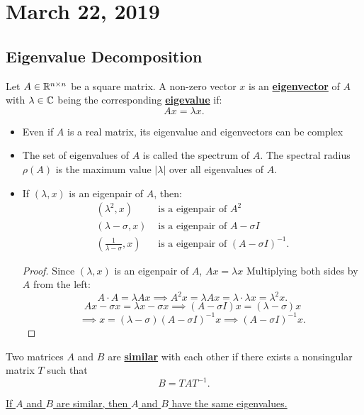 \documentclass[../main/main.tex]{subfiles}
\begin{document}
\section{March 22, 2019}
\subsection{Eigenvalue Decomposition}

		Let $A \in \mathbb{R}^{n\times n}$ be a square matrix. A non-zero vector $x$ is an \underline{\textbf{eigenvector}} of $A$ with  $\lambda\in \mathbb{C}$ being the corresponding \underline{\textbf{eigevalue}} if: \[
		Ax=\lambda x		.\]  	

\begin{itemize}
		\itemsep0.3cm
				\item Even if $A$ is a real matrix, its eigenvalue and eigenvectors can be complex
				\item The set of eigenvalues of $A$ is called the spectrum of $A$. The spectral radius $\rho\left( A \right) $ is the maximum value $\left| \lambda \right| $ over all eigenvalues of $A$.
				\item If $\left(\lambda,x \right) $ is an eigenpair of $A$, then:
						\begin{align*}
								\left( \lambda^2,x \right) &\textrm{ is a eigenpair of }A^2\\
								\left( \lambda-\sigma,x \right) &\textrm{ is a eigenpair of }A-\sigma I\\
								\left( \frac{1}{\lambda-\sigma},x \right) &\textrm{ is a eigenpair of }\left( A-\sigma I \right) ^{-1}
						.\end{align*}
\begin{proof}
							Since $\left( \lambda,x \right) $ is an eigenpair of $A$, $Ax=\lambda x$ Multiplying both sides by $A$ from the left:\[
				A\cdot A=\lambda A x \implies A^2x=\lambda Ax=\lambda\cdot\lambda x=\lambda^2 x
				.\] 
				\[
						Ax-\sigma x=\lambda x-\sigma x \implies \left( A-\sigma I \right) x=\left( \lambda-\sigma\right)x\]\[\implies x=\left( \lambda-\sigma \right) \left( A-\sigma I \right) ^{-1}x\implies\left( A-\sigma I \right) ^{-1}x
				.\]		
\end{proof}
\end{itemize}
\begin{definition}
	Two matrices $A$ and $B$ are \underline{\textbf{similar}} with each other if there exists a nonsingular matrix $T$ such that \[
		B=TAT^{-1}
		.\]  
\end{definition}
\begin{theorem}
	\underline{If $A$ and $B$ are similar, then $A$ and $B$ have the same eigenvalues.}
\end{theorem}
\end{document}
